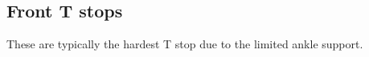 \subsection*{Front T stops}
\label{drill:t_stop:front}

These are typically the hardest T stop due to the limited ankle support.

 

